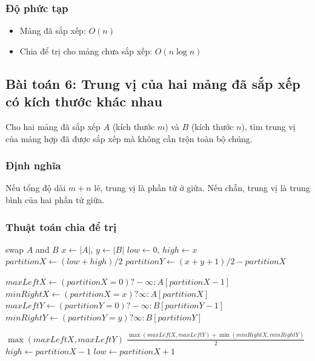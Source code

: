 \documentclass{article}
\begin{document}
\subsubsection{Độ phức tạp}
\begin{itemize}
    \item Mảng đã sắp xếp: \(O(n)\)
    \item Chia để trị cho mảng chưa sắp xếp: \(O(n \log n)\)
\end{itemize}

\subsection{Bài toán 6: Trung vị của hai mảng đã sắp xếp có kích thước khác nhau}

Cho hai mảng đã sắp xếp \(A\) (kích thước \(m\)) và \(B\) (kích thước \(n\)), tìm trung vị của mảng hợp đã được sắp xếp mà không cần trộn toàn bộ chúng.

\subsubsection{Định nghĩa}
Nếu tổng độ dài \(m+n\) lẻ, trung vị là phần tử ở giữa. Nếu chẵn, trung vị là trung bình của hai phần tử giữa.

\subsubsection{Thuật toán chia để trị}

\begin{algorithmic}[1]
        \State swap $A$ and $B$
    \EndIf
    \State $x \gets |A|$, $y \gets |B|$
    \State $low \gets 0$, $high \gets x$
        \State $partitionX \gets (low + high)/2$
        \State $partitionY \gets (x + y + 1)/2 - partitionX$
        
        \State $maxLeftX \gets (partitionX = 0) ? -\infty : A[partitionX-1]$
        \State $minRightX \gets (partitionX = x) ? \infty : A[partitionX]$
        \State $maxLeftY \gets (partitionY = 0) ? -\infty : B[partitionY-1]$
        \State $minRightY \gets (partitionY = y) ? \infty : B[partitionY]$
        
                \State \Return $\max(maxLeftX, maxLeftY)$
            \Else
                \State \Return $\frac{\max(maxLeftX, maxLeftY) + \min(minRightX, minRightY)}{2}$
            \EndIf
            \State $high \gets partitionX - 1$
        \Else
            \State $low \gets partitionX + 1$
        \EndIf
    \EndWhile
\EndFunction
\end{algorithmic}
\end{document}
